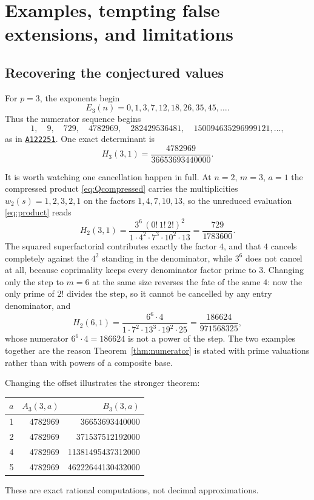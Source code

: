 \documentclass[11pt,a4paper]{article}
\numberwithin{equation}{section}
\theoremstyle{definition}
\theoremstyle{remark}
\newcommand{\OEIS}[1]{\href{https://oeis.org/#1}{\texttt{#1}}}
\begin{document}
\section{Examples, tempting false extensions, and limitations}\label{sec:examples}

\subsection{Recovering the conjectured values}
For $p=3$, the exponents begin
\[
 E_3(n)=0,1,3,7,12,18,26,35,45,\ldots.
\]
Thus the numerator sequence begins
\[
 1,\quad9,\quad729,\quad4782969,\quad282429536481,\quad
 150094635296999121,\ldots,
\]
as in \OEIS{A122251}. One exact determinant is
\[
 H_3(3,1)=\frac{4782969}{36653693440000}.
\]

It is worth watching one cancellation happen in full. At $n=2$, $m=3$, $a=1$ the compressed product \eqref{eq:Qcompressed} carries the multiplicities $w_2(s)=1,2,3,2,1$ on the factors $1,4,7,10,13$, so the unreduced evaluation \eqref{eq:product} reads
\[
 H_2(3,1)=\frac{3^6\,(0!\,1!\,2!)^2}{1\cdot4^2\cdot7^3\cdot10^2\cdot13}
 =\frac{729}{1783600}.
\]
The squared superfactorial contributes exactly the factor $4$, and that $4$ cancels completely against the $4^2$ standing in the denominator, while $3^6$ does not cancel at all, because coprimality keeps every denominator factor prime to $3$. Changing only the step to $m=6$ at the same size reverses the fate of the same $4$: now the only prime of $2!$ divides the step, so it cannot be cancelled by any entry denominator, and
\[
 H_2(6,1)=\frac{6^6\cdot4}{1\cdot7^2\cdot13^3\cdot19^2\cdot25}
 =\frac{186624}{971568325},
\]
whose numerator $6^6\cdot4=186624$ is not a power of the step. The two examples together are the reason Theorem~\ref{thm:numerator} is stated with prime valuations rather than with powers of a composite base.

Changing the offset illustrates the stronger theorem:
\begin{center}
\begin{tabular}{r r r}
\toprule
$a$ & $A_3(3,a)$ & $B_3(3,a)$\\
\midrule
1 & 4782969 & 36653693440000\\
2 & 4782969 & 371537512192000\\
4 & 4782969 & 11381495437312000\\
5 & 4782969 & 46222644130432000\\
\bottomrule
\end{tabular}
\end{center}
These are exact rational computations, not decimal approximations.
\end{document}
